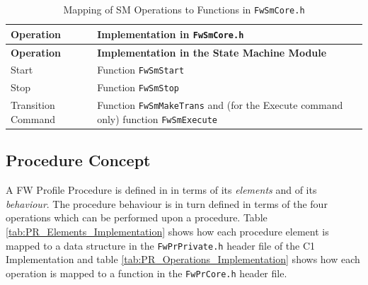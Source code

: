 \documentclass[requirements]{../fwprofile}
\begin{document}
\begin{longtable}{|>{\raggedright}p{2.7cm}|P{8.5cm}|}
\caption{Mapping of SM Operations to Functions in \texttt{FwSmCore.h}}
\label{tab:SM_Operations_Implementation} \\
\hline
{}
\textbf{Operation} & \textbf{Implementation in \texttt{FwSmCore.h}} \\
\hline
\endfirsthead
{}
\textbf{Operation} & \textbf{Implementation in the State Machine Module} \\
\hline
\endhead

Start & Function \texttt{FwSmStart} \\
\hline
Stop  & Function \texttt{FwSmStop} \\
\hline
Transition Command & Function \texttt{FwSmMakeTrans} and (for the Execute command only) 
function \texttt{FwSmExecute} \\
\hline
\end{longtable}

\subsection{Procedure Concept}\label{Appendix_A_Implementation_PR_Concept}
A FW Profile Procedure is defined in \cite{ref:fwprofile} in terms of its \emph{elements} 
and of its \emph{behaviour}. 
The procedure behaviour is in turn defined in terms of the four operations which can 
be performed upon a procedure. 
Table \ref{tab:PR_Elements_Implementation} shows how each procedure element is mapped to 
a data structure in the 
\texttt{FwPrPrivate.h} header file of the C1 Implementation and table \ref{tab:PR_Operations_Implementation} shows 
how each operation is mapped to a function in the \texttt{FwPrCore.h} header file.
\end{document}
